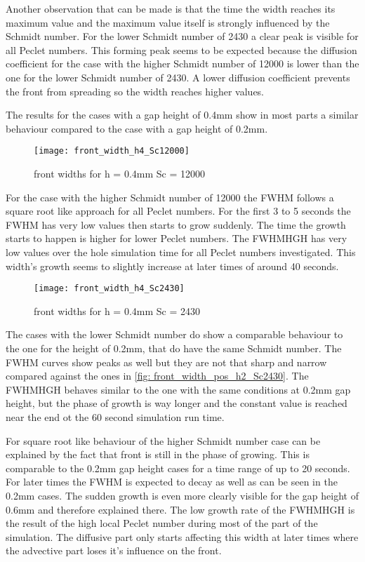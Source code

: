\documentclass[../thesis.tex]{subfiles}
\begin{document}
Another observation that can be made is that the time the width reaches its maximum value and the maximum value itself is strongly influenced by the Schmidt number. For the lower Schmidt number of 2430 a clear peak is visible for all Peclet numbers. This forming peak seems to be expected because the diffusion coefficient for the case with the higher Schmidt number of 12000 is lower than the one for the lower Schmidt number of 2430. A lower diffusion coefficient prevents the front from spreading so the width reaches higher values.
\newline

The results for the cases with a gap height of 0.4mm show in most parts a similar behaviour compared to the case with a gap height of 0.2mm.
\begin{figure}[htb]
	\centering
	\texttt{[image: front\_width\_h4\_Sc12000]}
	\caption{front widths for  h = 0.4mm Sc = 12000
	\label{fig: front_width_h4_Sc12000}}
\end{figure}
For the case with the higher Schmidt number of 12000 the FWHM follows a square root like approach for all Peclet numbers. For the first 3 to 5 seconds the FWHM has very low values then starts to grow suddenly. The time the growth starts to happen is higher for lower Peclet numbers. The FWHMHGH has very low values over the hole simulation time for all Peclet numbers investigated. This width's growth seems to slightly increase at later times of around 40 seconds.
\begin{figure}[htb]
	\centering
	\texttt{[image: front\_width\_h4\_Sc2430]}
	\caption{front widths for  h = 0.4mm Sc = 2430
		\label{fig: front_width_pos_h4_Sc2430}}
\end{figure}

The cases with the lower Schmidt number do show a comparable behaviour to the one for the height of 0.2mm, that do have the same Schmidt number. The FWHM curves show peaks as well but they are not that sharp and narrow compared against the ones in \autoref{fig: front_width_pos_h2_Sc2430}. The FWHMHGH behaves similar to the one with the same conditions at 0.2mm gap height, but the phase of growth is way longer and the constant value is reached near the end ot the 60 second simulation run time.

For square root like behaviour of the higher Schmidt number case can be explained by the fact that front is still in the phase of growing. This is comparable to the 0.2mm gap height cases for a time range of up to 20 seconds. For later times the FWHM is expected to decay as well as can be seen in the 0.2mm cases. The sudden growth is even more clearly visible for the gap height of 0.6mm and therefore explained there. The low growth rate of the FWHMHGH is the result of the high local Peclet number during most of the part of the simulation. The diffusive part only starts affecting this width at later times where the advective part loses it's influence on the front.
\end{document}
